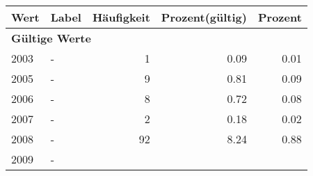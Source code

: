      \begin{longtable}{lXrrr}
     \toprule
     \textbf{Wert} & \textbf{Label} & \textbf{Häufigkeit} & \textbf{Prozent(gültig)} & \textbf{Prozent} \\
     \endhead
     \midrule
     \multicolumn{5}{l}{\textbf{Gültige Werte}}\\

     2003 &
     \multicolumn{1}{X}{ -  } &


       \num{1} &
       \num[round-mode=places,round-precision=2]{0,09} &
         \num[round-mode=places,round-precision=2]{0,01} \\

     2005 &
     \multicolumn{1}{X}{ -  } &


       \num{9} &
       \num[round-mode=places,round-precision=2]{0,81} &
         \num[round-mode=places,round-precision=2]{0,09} \\

     2006 &
     \multicolumn{1}{X}{ -  } &


       \num{8} &
       \num[round-mode=places,round-precision=2]{0,72} &
         \num[round-mode=places,round-precision=2]{0,08} \\

     2007 &
     \multicolumn{1}{X}{ -  } &


       \num{2} &
       \num[round-mode=places,round-precision=2]{0,18} &
         \num[round-mode=places,round-precision=2]{0,02} \\

     2008 &
     \multicolumn{1}{X}{ -  } &


       \num{92} &
       \num[round-mode=places,round-precision=2]{8,24} &
         \num[round-mode=places,round-precision=2]{0,88} \\

     2009 &
     \multicolumn{1}{X}{ -  } &



\end{longtable}

